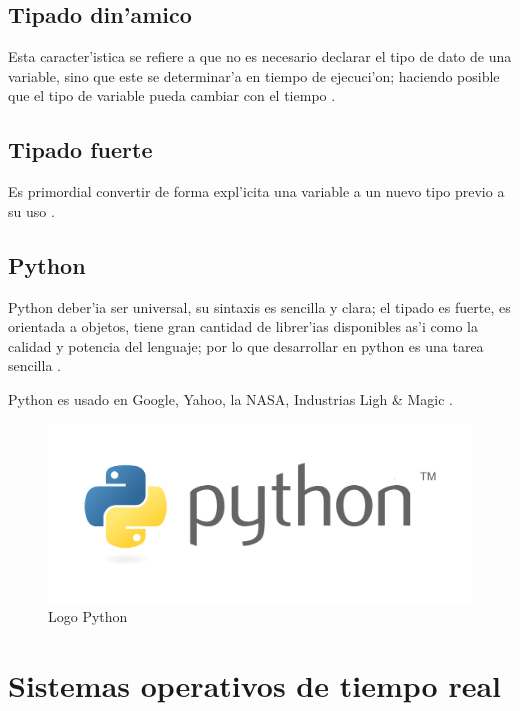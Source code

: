 \subsection{Tipado din'amico}

Esta caracter'istica se refiere a que no es necesario declarar el tipo de dato de una variable, sino que este se determinar'a en tiempo de ejecuci'on; haciendo posible que el tipo de variable pueda cambiar con el tiempo \citep{gonzales14}.

\subsection{Tipado fuerte}

Es primordial convertir de forma expl'icita una variable a un nuevo tipo previo a su uso \citep{gonzales14}.

\subsection{Python}

Python deber'ia ser universal, su sintaxis es sencilla y clara; el tipado es fuerte, es orientada a objetos, tiene gran cantidad de librer'ias disponibles as'i como la calidad y potencia del lenguaje; por lo que desarrollar en python es una tarea sencilla \citep{gonzales14}.

Python es usado en Google, Yahoo, la NASA, Industrias Ligh \& Magic \citep{gonzales14}.

\begin{figure}[h]
	\centering
		\includegraphics[scale=0.10]{Python_logo}
	\caption{Logo Python \texttrademark}
	\label{fig:Pythonlogo}
\end{figure}

\section{Sistemas operativos de tiempo real}

